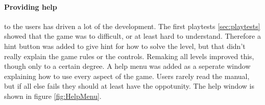\paragraph{Providing help} to the users has driven a lot of the development.
The first playtests \ref{sec:playtests} showed that the game was to difficult,
or at least hard to understand. Therefore a hint button was added to give
hint for how to solve the level, but that didn't really explain the game
rules or the controls. Remaking all levels improved this, though only to a
certain degree. A help menu was added as a seperate window explaining
how to use every aspect of the game. Users rarely read the manual, but if
all else fails they should at least have the oppotunity. The help window is
shown in figure \ref{fig:HelpMenu}.


